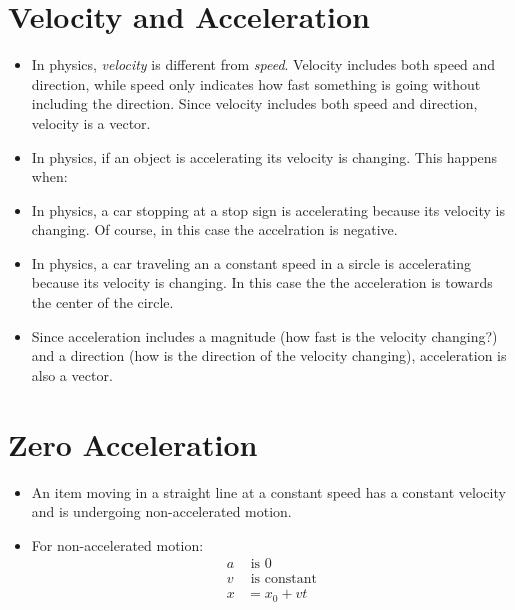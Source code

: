 \documentclass{article}
\begin{document}
\section{Velocity and Acceleration}
\begin{itemize}
  \item In physics, {\em velocity} is different from {\em speed}.  Velocity includes both speed and direction,
    while speed only indicates how fast something is going without including the direction.  Since velocity
    includes both speed and direction, velocity is a vector. 
  \item In physics, if an object is accelerating its velocity is changing.  This happens when:

  \item In physics, a car stopping at a stop sign is accelerating because its velocity is changing.  Of course, in this
    case the accelration is negative.

  \item In physics, a car traveling an a constant speed in a sircle is accelerating because its velocity is changing.  In this
    case the the acceleration is towards the center of the circle.

  \item Since acceleration includes a magnitude (how fast is the velocity changing?) and a direction (how is the
    direction of the velocity changing), acceleration is also a vector.
\end{itemize}

\section{Zero Acceleration}
\begin{itemize}
  \item An item moving in a straight line at a constant speed has a constant velocity and is undergoing non-accelerated
    motion. 
  \item For non-accelerated motion:
    \begin{align*}
      a &\text{ is 0} \\
      v &\text{ is constant} \\
      x &= x_0 + vt \\
    \end{align*}
\end{itemize}
\end{document}
